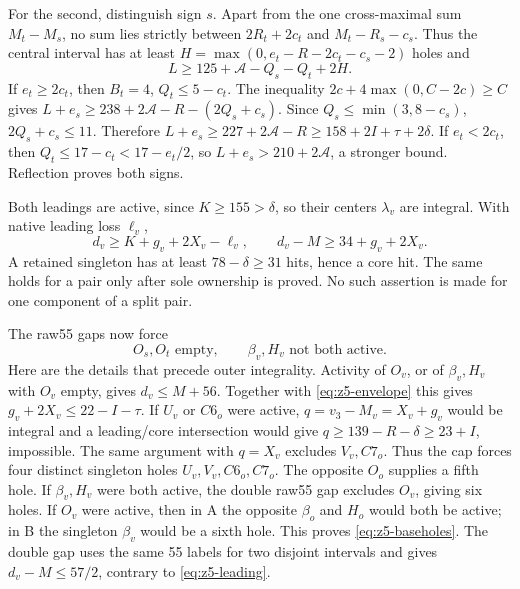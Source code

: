 \documentclass[11pt,letterpaper]{article}
\theoremstyle{definition}\newtheorem{definition}[theorem]{Definition}
\begin{document}
For the second, distinguish sign $s$. Apart from the one cross-maximal
sum $M_t-M_s$, no sum lies strictly between $2R_t+2c_t$ and
$M_t-R_s-c_s$. Thus the central interval has at least
$H=\max(0,e_t-R-2c_t-c_s-2)$ holes and
\[
 L\ge125+\mathcal A-Q_s-Q_t+2H.
\]
If $e_t\ge2c_t$, then $B_t=4$, $Q_t\le5-c_t$.
The inequality $2c+4\max(0,C-2c)\ge C$ gives
$L+e_s\ge238+2\mathcal A-R-(2Q_s+c_s)$.
Since $Q_s\le\min(3,8-c_s)$, $2Q_s+c_s\le11$.
Therefore $L+e_s\ge227+2\mathcal A-R
\ge158+2I+\tau+2\delta$.
If $e_t<2c_t$, then $Q_t\le17-c_t<17-e_t/2$, so
$L+e_s>210+2\mathcal A$, a stronger bound. Reflection proves both signs.

Both leadings are active, since $K\ge155>\delta$, so their centers
$\lambda_v$ are integral. With native leading loss $\ell_v$,
\begin{equation}\label{eq:z5-leading}
 d_v\ge K+g_v+2X_v-\ell_v,\qquad
 d_v-M\ge34+g_v+2X_v.
\end{equation}
A retained singleton has at least $78-\delta\ge31$ hits, hence a core
hit. The same holds for a pair only after sole ownership is proved.
No such assertion is made for one component of a split pair.

The raw55 gaps now force
\begin{equation}\label{eq:z5-baseholes}
 O_s,O_t\text{ empty},\qquad \beta_v,H_v\text{ not both active}.
\end{equation}
Here are the details that precede outer integrality. Activity of $O_v$,
or of $\beta_v,H_v$ with $O_v$ empty, gives $d_v\le M+56$.
Together with \eqref{eq:z5-envelope} this gives
$g_v+2X_v\le22-I-\tau$. If $U_v$ or $C6_o$ were active,
$q=v_3-M_v=X_v+g_v$ would be integral and a leading/core intersection
would give $q\ge139-R-\delta\ge23+I$, impossible. The same argument
with $q=X_v$ excludes $V_v,C7_o$. Thus the cap forces four distinct
singleton holes $U_v,V_v,C6_o,C7_o$.
The opposite $O_o$ supplies a fifth hole. If $\beta_v,H_v$ were both
active, the double raw55 gap excludes $O_v$, giving six holes.
If $O_v$ were active, then in A the opposite $\beta_o$ and $H_o$
would both be active; in B the singleton $\beta_v$ would be a sixth
hole. This proves \eqref{eq:z5-baseholes}. The double gap uses the
same 55 labels for two disjoint intervals and gives
$d_v-M\le57/2$, contrary to \eqref{eq:z5-leading}.
\end{document}
